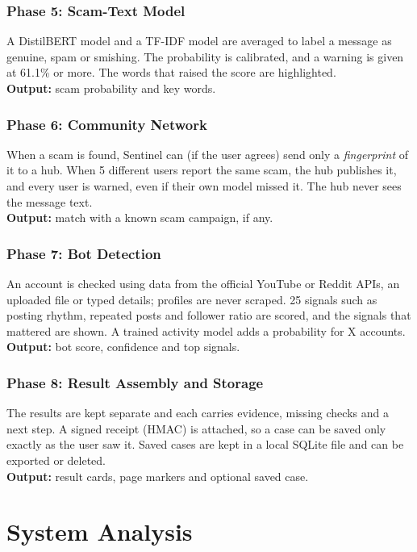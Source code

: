\subsubsection*{Phase 5: Scam-Text Model}
\noindent A DistilBERT model and a TF-IDF model are averaged to label a message as genuine, spam or smishing. The probability is calibrated, and a warning is given at 61.1\% or more. The words that raised the score are highlighted.\\
\textbf{Output:} scam probability and key words.

\subsubsection*{Phase 6: Community Network}
\noindent When a scam is found, Sentinel can (if the user agrees) send only a \emph{fingerprint} of it to a hub. When 5 different users report the same scam, the hub publishes it, and every user is warned, even if their own model missed it. The hub never sees the message text.\\
\textbf{Output:} match with a known scam campaign, if any.

\subsubsection*{Phase 7: Bot Detection}
\noindent An account is checked using data from the official YouTube or Reddit APIs, an uploaded file or typed details; profiles are never scraped. 25 signals such as posting rhythm, repeated posts and follower ratio are scored, and the signals that mattered are shown. A trained activity model adds a probability for X accounts.\\
\textbf{Output:} bot score, confidence and top signals.

\subsubsection*{Phase 8: Result Assembly and Storage}
\noindent The results are kept separate and each carries evidence, missing checks and a next step. A signed receipt (HMAC) is attached, so a case can be saved only exactly as the user saw it. Saved cases are kept in a local SQLite file and can be exported or deleted.\\
\textbf{Output:} result cards, page markers and optional saved case.

\section{System Analysis}
